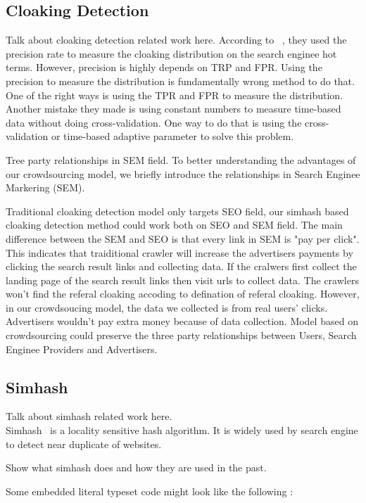\subsection{Cloaking Detection}
Talk about cloaking detection related work here.
According to ~\cite{wang2011cloak}, they used the precision rate to measure the cloaking distribution on the search enginee hot terms. However, precision is highly depends on TRP and FPR. Using the precision to measure the distribution is fundamentally wrong method to do that. One of the right ways is using the TPR and FPR to measure the distribution. Another mistake they made is using constant numbers to measure time-based data without doing cross-validation. One way to do that is using the cross-validation or time-based adaptive parameter to solve this problem. 

Tree party relationships in SEM field. 
To better understanding the advantages of our crowdsourcing model, we briefly introduce the relationships in Search Enginee Markering (SEM). 

Traditional cloaking detection model only targets SEO field, our simhash based cloaking detection method could work both on SEO and SEM field. The main difference between the SEM and SEO is that every link in SEM is "pay per click". This indicates that  traiditional crawler will increase the advertisers payments by clicking the search result links and collecting data. If the cralwers first collect the landing page of the search result links then visit urls to collect data. The crawlers won't find the referal cloaking accoding to defination of referal cloaking. However, in our crowdsoucing model, the data we collected is from real users' clicks. Advertisers wouldn't pay extra money because of data collection. 
Model based on crowdsourcing could preserve the three party relationships between Users, Search Enginee Providers and Advertisers.



\subsection{Simhash}
Talk about simhash related work here. \\
Simhash~\cite{charikar2002similarity}  is a locality sensitive hash algorithm.
It is widely used by search engine to detect near duplicate of websites.


Show what simhash does and how they are used in the past.

Some embedded literal typeset code might 
look like the following :

